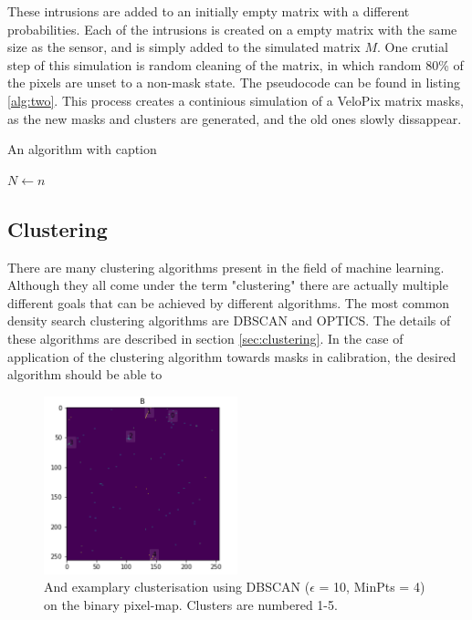 These intrusions are added to an initially empty matrix with a different probabilities. Each of the intrusions is created on a empty matrix with the same size as the sensor, and is simply added to the simulated matrix $M$.
One crutial step of this simulation is random cleaning of the matrix, in which random 80\% of the pixels are unset to a non-mask state.
The pseudocode can be found in listing \ref{alg:two}.
This process creates a continious simulation of a VeloPix matrix masks, as the new masks and clusters are generated, and the old ones slowly dissappear.




\begin{algorithm}[H]
\caption{An algorithm with caption}\label{alg:two}
$N \gets n$\;
\end{algorithm}




\subsection{Clustering}

There are many clustering algorithms present in the field of machine learning. Although they all come under the term "clustering" there are actually multiple different goals that can be achieved by different algorithms. The most common density search clustering algorithms are DBSCAN and OPTICS. The details of these algorithms are described in section \ref{sec:clustering}.
In the case of application of the clustering algorithm towards masks in calibration, the desired algorithm should be able to

\begin{figure}[h]
\centering
\includegraphics[width=0.5\textwidth]{figures/chapter4/velopix_clusters/dbscan_clusters.png}
\caption{And examplary clusterisation using DBSCAN ($\epsilon$ = 10, MinPts = 4) on the binary pixel-map. Clusters are numbered 1-5.}
\label{fig:dbscan_clusters}
\end{figure}

